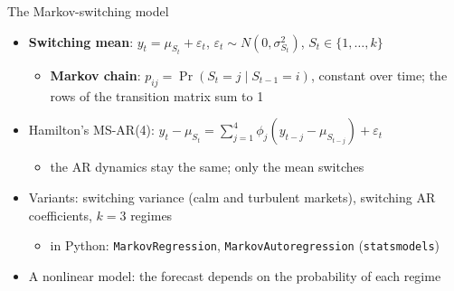\begin{frame}{The Markov-switching model}
\itemsize{\small}
\begin{itemize}
    \item \textbf{Switching mean}: $y_t = \mu_{S_t} + \varepsilon_t$, \quad $\varepsilon_t \sim N(0, \sigma^2_{S_t})$, \quad $S_t \in \{1, \dots, k\}$
    \begin{itemize}
        \item \textbf{Markov chain}: $p_{ij} = \Pr(S_t = j \mid S_{t-1} = i)$, constant over time; the rows of the transition matrix sum to 1
    \end{itemize}
    \item Hamilton's MS-AR(4): $y_t - \mu_{S_t} = \sum_{j=1}^{4}\phi_j(y_{t-j} - \mu_{S_{t-j}}) + \varepsilon_t$
    \begin{itemize}
        \item the AR dynamics stay the same; only the mean switches
    \end{itemize}
    \item Variants: switching variance (calm and turbulent markets), switching AR coefficients, $k = 3$ regimes
    \begin{itemize}
        \item in Python: \texttt{MarkovRegression}, \texttt{MarkovAutoregression} (\texttt{statsmodels})
    \end{itemize}
    \item A nonlinear model: the forecast depends on the probability of each regime
\end{itemize}
\end{frame}


